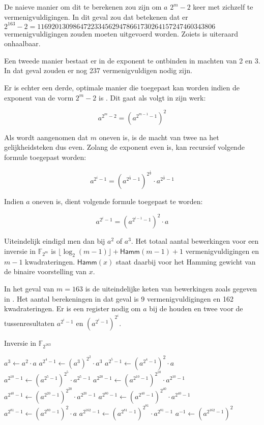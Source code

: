 De naieve manier om dit te berekenen zou zijn om $a$ $2^m - 2$ keer met zichzelf te vermenigvuldigingen. In dit geval zou dat betekenen dat er $2^{163} -2 = 11 692 013 098 647 223 345 629 478 661 730 264 157 247 460 343 806$ vermenigvuldigingen zouden moeten uitgevoerd worden. Zoiets is uiteraard onhaalbaar.

Een tweede manier bestaat er in de exponent te ontbinden in machten van 2 en 3. In dat geval zouden er nog 237 vermenigvuldigen nodig zijn.

Er is echter een derde, optimale manier die toegepast kan worden indien de exponent van de vorm $2^m - 2$ is \cite{batina-pkc}\cite{itoh}. Dit gaat als volgt in zijn werk:

\[a^{2^m - 2} = (a^{2^{m - 1} - 1})^2\]

Als wordt aangenomen dat $m$ oneven is, is de macht van twee na het gelijkheidsteken dus even. Zolang de exponent even is, kan recursief volgende formule toegepast worden:

\[a^{2^i - 1} = (a^{2^{\frac{i}{2}} - 1})^{2^{\frac{i}{2}}} \cdot a^{2^{\frac{i}{2}} - 1}\]

Indien $a$ oneven is, dient volgende formule toegepast te worden:

\[a^{2^i - 1} = (a^{2^{i - 1} - 1})^2 \cdot a\]

Uiteindelijk eindigd men dan bij $a^2$ of $a^3$. Het totaal aantal bewerkingen voor een inversie in $\mathbb{F}_{2^m}$ is $\lfloor\log_2(m - 1)\rfloor + \textsf{Hamm}(m - 1) + 1$ vermenigvuldigingen en $m - 1$ kwadrateringen. $\textsf{Hamm}(x)$ staat daarbij voor het Hamming gewicht van de binaire voorstelling van $x$.

In het geval van $m = 163$ is de uiteindelijke keten van bewerkingen zoals gegeven in . Het aantal berekeningen in dat geval is 9 vermenigvuldigingen en 162 kwadrateringen. Er is een register nodig om $a$ bij de houden en twee voor de tussenresultaten $a^{2^i - 1}$ en $(a^{2^i - 1})^{2^i}$.

\begin{algorithm}[h]
	\caption{Inversie in $\mathbb{F}_{2^{163}}$}
	\label{algoritme-implementatie-miller-inversie}
	$a^3 \leftarrow a^2 \cdot a$\;
	$a^{2^4 - 1} \leftarrow (a^3)^{2^2} \cdot a^3$\;
	$a^{2^5 - 1} \leftarrow (a^{2^4 - 1})^2 \cdot a$\;
	$a^{2^{10} - 1} \leftarrow (a^{2^5 - 1})^{2^5} \cdot a^{2^5 - 1}$\;
	$a^{2^{20} - 1} \leftarrow (a^{2^{10} - 1})^{2^{10}} \cdot a^{2^{10} - 1}$\;
	$a^{2^{40} - 1} \leftarrow (a^{2^{20} - 1})^{2^{20}} \cdot a^{2^{20} - 1}$\;
	$a^{2^{80} - 1} \leftarrow (a^{2^{40} - 1})^{2^{40}} \cdot a^{2^{40} - 1}$\;
	$a^{2^{81} - 1} \leftarrow (a^{2^{80} - 1})^2 \cdot a$\;
	$a^{2^{162} - 1} \leftarrow (a^{2^{81} - 1})^{2^{81}} \cdot a^{2^{81} - 1}$\;
	$a^{-1} \leftarrow (a^{2^{162} - 1})^2$\;
\end{algorithm}

